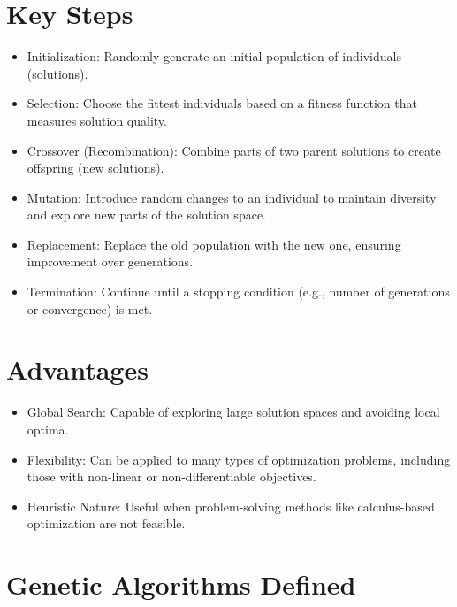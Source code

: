 \documentclass[
  letterpaper,
  DIV=11,
  numbers=noendperiod]{scrreprt}
\providecommand{\tightlist}{%
  \setlength{\itemsep}{0pt}\setlength{\parskip}{0pt}}\usepackage{longtable,booktabs,array}
\begin{document}
\section{Key Steps}\label{key-steps}

\begin{itemize}
\tightlist
\item
  Initialization: Randomly generate an initial population of individuals
  (solutions).
\item
  Selection: Choose the fittest individuals based on a fitness function
  that measures solution quality.
\item
  Crossover (Recombination): Combine parts of two parent solutions to
  create offspring (new solutions).
\item
  Mutation: Introduce random changes to an individual to maintain
  diversity and explore new parts of the solution space.
\item
  Replacement: Replace the old population with the new one, ensuring
  improvement over generations.
\item
  Termination: Continue until a stopping condition (e.g., number of
  generations or convergence) is met.
\end{itemize}

\section{Advantages}\label{advantages-1}

\begin{itemize}
\tightlist
\item
  Global Search: Capable of exploring large solution spaces and avoiding
  local optima.
\item
  Flexibility: Can be applied to many types of optimization problems,
  including those with non-linear or non-differentiable objectives.
\item
  Heuristic Nature: Useful when problem-solving methods like
  calculus-based optimization are not feasible.
\end{itemize}

\section{Genetic Algorithms Defined}\label{genetic-algorithms-defined}
\end{document}
